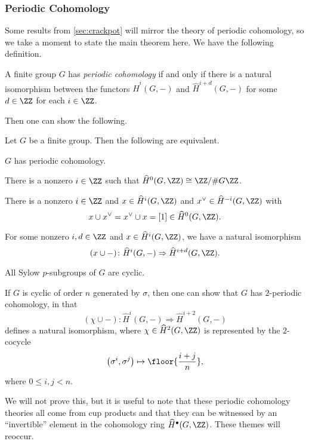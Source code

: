 \subsubsection{Periodic Cohomology}
Some results from \autoref{sec:crackpot} will mirror the theory of periodic cohomology, so we take a moment to state the main theorem here. We have the following definition.
\begin{definition}
	A finite group $G$ has \textit{periodic cohomology} if and only if there is a natural isomorphism between the functors $\widehat H^i(G,-)$ and $\widehat H^{i+d}(G,-)$ for some $d\in\ZZ$ for each $i\in\ZZ$.
\end{definition}
Then one can show the following.
\begin{theorem}
	Let $G$ be a finite group. Then the following are equivalent.
	\begin{listalph}
		\item $G$ has periodic cohomology.
		\item There is a nonzero $i\in\ZZ$ such that $\widehat H^0(G,\ZZ)\cong\ZZ/\#G\ZZ$.
		\item There is a nonzero $i\in\ZZ$ and $x\in\widehat H^i(G,\ZZ)$ and $x^\lor\in\widehat H^{-i}(G,\ZZ)$ with
		\[x\cup x^\lor=x^\lor\cup x=[1]\in\widehat H^0(G,\ZZ).\]
		\item For some nonzero $i,d\in\ZZ$ and $x\in\widehat H^i(G,\ZZ)$, we have a natural isomorphism
		\[(x\cup-)\colon\widehat H^i(G,-)\Rightarrow\widehat H^{i+d}(G,\ZZ).\]
		\item All Sylow $p$-subgroups of $G$ are cyclic.
	\end{listalph}
\end{theorem}
\begin{example}
	If $G$ is cyclic of order $n$ generated by $\sigma$, then one can show that $G$ has $2$-periodic cohomology, in that
	\[(\chi\cup-)\colon\widehat H^i(G,-)\Rightarrow\widehat H^{i+2}(G,-)\]
	defines a natural isomorphism, where $\chi\in\widehat H^2(G,\ZZ)$ is represented by the $2$-cocycle
	\[\left(\sigma^i,\sigma^j\right)\mapsto\floor{\frac{i+j}n},\]
	where $0\le i,j<n$.
\end{example}
We will not prove this, but it is useful to note that these periodic cohomology theories all come from cup products and that they can be witnessed by an ``invertible'' element in the cohomology ring $\widehat H^\bullet(G,\ZZ)$. These themes will reoccur.

